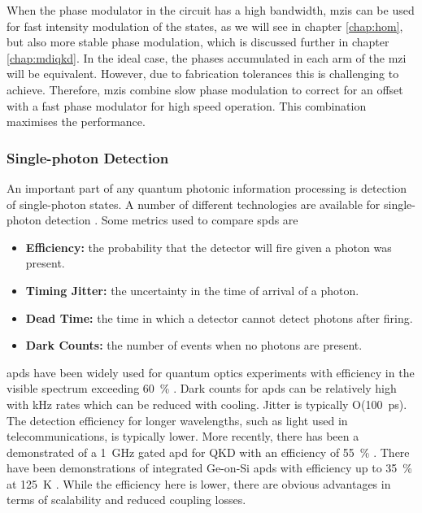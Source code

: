 When the phase modulator in the circuit has a high bandwidth, \acp{mzi} can be used for fast intensity modulation of the states, as we will see in chapter \ref{chap:hom}, but also more stable phase modulation, which is discussed further in chapter \ref{chap:mdiqkd}. In the ideal case, the phases accumulated in each arm of the \ac{mzi} will be equivalent. However, due to fabrication tolerances this is challenging to achieve. Therefore, \acp{mzi} combine slow phase modulation to correct for an offset with a fast phase modulator for high speed operation. This combination maximises the performance.

\subsubsection*{Single-photon Detection}

An important part of any quantum photonic information processing is detection of single-photon states. A number of different technologies are available for single-photon detection \cite{hadfield2009single}. Some metrics used to compare \acp{spd} are

\begin{itemize}
	\item \textbf{Efficiency:} the probability that the detector will fire given a photon was present.
	\item \textbf{Timing Jitter:} the uncertainty in the time of arrival of a photon.
	\item \textbf{Dead Time:} the time in which a detector cannot detect photons after firing.
	\item \textbf{Dark Counts:} the number of events when no photons are present.
\end{itemize}

\Acp{apd} have been widely used for quantum optics experiments with efficiency in the visible spectrum exceeding \SI{60}{\percent} \cite{hadfield2009single}. Dark counts for \acp{apd} can be relatively high with \si{kHz} rates which can be reduced with cooling. Jitter is typically O(\SI{100}{ps}). The detection efficiency for longer wavelengths, such as light used in telecommunications, is typically lower. More recently, there has been a demonstrated of a \SI{1}{GHz} gated \ac{apd} for \ac{QKD} with an efficiency of \SI{55}{\percent} \cite{comandar2015gigahertz}. There have been demonstrations of integrated Ge-on-Si \acp{apd} with efficiency up to \SI{35}{\percent} at \SI{125}{\kelvin} \cite{Martinez2017Single, vines2019high}. While the efficiency here is lower, there are obvious advantages in terms of scalability and reduced coupling losses.

